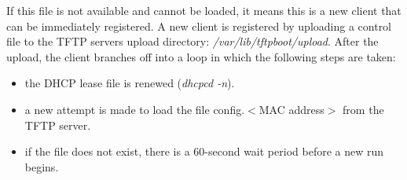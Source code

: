 \begin{enumerate}
          If this file is not available and cannot be loaded, it means this
          is a new client that can be immediately registered. A new client is
          registered by uploading a control file to the TFTP servers upload
          directory: \textit{/var/lib/tftpboot/upload}. After the upload, the client
          branches off into a loop in which the following steps are taken:

          \begin{itemize}
          \item the DHCP lease file is renewed (\textit{dhcpcd -n}).
          \item a new attempt is made to load the file
                config.$<$MAC address$>$ from the TFTP server.
          \item if the file does not exist, there is a 60-second wait
                period before a new run begins.
          \end{itemize}


\end{enumerate}
